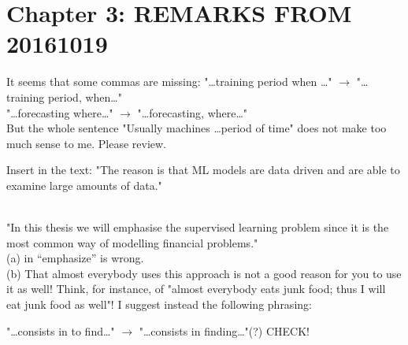 


\section{Chapter 3: REMARKS FROM 20161019}


\begin{description}[style=unboxed,leftmargin=0cm,itemsep=3ex]

It seems that some commas are missing:
"\dots training period when \dots" 
\quad$\longrightarrow$\quad
"\dots training period, when\dots" \\
"\dots forecasting where\dots"
\quad$\longrightarrow$\quad
"\dots forecasting, where\dots" \\
But the whole sentence "Usually machines \dots period of time"
does not make too much sense to me. Please review.

Insert  in the text:
"The reason  is that ML models are data driven and are
able to examine large amounts of data."

\mbox{}\\
\quad
"In this thesis we will emphasise the supervised learning
problem since it is the most common way of modelling financial problems."\\
\quad
(a)  in ``emphasize'' is wrong. \\
(b) That almost everybody uses this approach is not a good reason for you
to use it as well!
Think, for instance, of "almost everybody eats junk food; thus I will
eat junk food as well"!
I suggest instead the following phrasing: \\

\vspace{1ex}\quad
"\dots consists in to find\dots"
\quad$\longrightarrow$\quad
"\dots consists in finding\dots"\quad (?)  CHECK!


\end{description}

